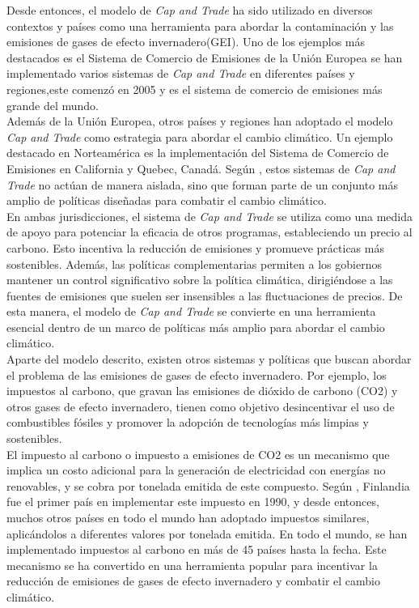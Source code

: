 Desde entonces, el modelo de \textit{Cap and Trade} ha sido utilizado en diversos contextos y países como una herramienta para abordar la contaminación y las emisiones de gases de efecto invernadero(GEI). Uno de los ejemplos más destacados es el Sistema de Comercio de Emisiones de la Unión Europea se han implementado varios sistemas de \textit{Cap and Trade} en diferentes países y regiones,este comenzó en 2005 y es el sistema de comercio de emisiones más grande del mundo.\\


Además de la Unión Europea, otros países y regiones han adoptado el modelo \textit{Cap and Trade} como estrategia para abordar el cambio climático. Un ejemplo destacado en Norteamérica es la implementación del Sistema de Comercio de Emisiones en California y Quebec, Canadá. Según , estos sistemas de \textit{Cap and Trade} no actúan de manera aislada, sino que forman parte de un conjunto más amplio de políticas diseñadas para combatir el cambio climático.\\

En ambas jurisdicciones, el sistema de \textit{Cap and Trade} se utiliza como una medida de apoyo para potenciar la eficacia de otros programas, estableciendo un precio al carbono. Esto incentiva la reducción de emisiones y promueve prácticas más sostenibles. Además, las políticas complementarias permiten a los gobiernos mantener un control significativo sobre la política climática, dirigiéndose a las fuentes de emisiones que suelen ser insensibles a las fluctuaciones de precios. De esta manera, el modelo de \textit{Cap and Trade} se convierte en una herramienta esencial dentro de un marco de políticas más amplio para abordar el cambio climático.\\

Aparte del modelo descrito, existen otros sistemas y políticas que buscan abordar el problema de las emisiones de gases de efecto invernadero. Por ejemplo, los impuestos al carbono, que gravan las emisiones de dióxido de carbono (CO2) y otros gases de efecto invernadero, tienen como objetivo desincentivar el uso de combustibles fósiles y promover la adopción de tecnologías más limpias y sostenibles.\\

El impuesto al carbono o impuesto a emisiones de CO2 es un mecanismo que implica un costo adicional para la generación de electricidad con energías no renovables, y se cobra por tonelada emitida de este compuesto. Según , Finlandia fue el primer país en implementar este impuesto en 1990, y desde entonces, muchos otros países en todo el mundo han adoptado impuestos similares, aplicándolos a diferentes valores por tonelada emitida. En todo el mundo, se han implementado impuestos al carbono en más de 45 países hasta la fecha. Este mecanismo se ha convertido en una herramienta popular para incentivar la reducción de emisiones de gases de efecto invernadero y combatir el cambio climático.\\

